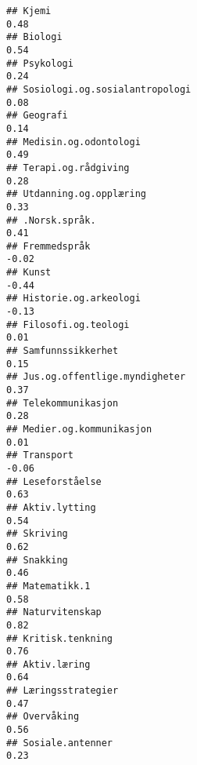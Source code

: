 \documentclass[
]{article}
\begin{document}
\begin{verbatim}
## Kjemi                                                                             0.48
## Biologi                                                                           0.54
## Psykologi                                                                         0.24
## Sosiologi.og.sosialantropologi                                                    0.08
## Geografi                                                                          0.14
## Medisin.og.odontologi                                                             0.49
## Terapi.og.rådgiving                                                               0.28
## Utdanning.og.opplæring                                                            0.33
## .Norsk.språk.                                                                     0.41
## Fremmedspråk                                                                     -0.02
## Kunst                                                                            -0.44
## Historie.og.arkeologi                                                            -0.13
## Filosofi.og.teologi                                                               0.01
## Samfunnssikkerhet                                                                 0.15
## Jus.og.offentlige.myndigheter                                                     0.37
## Telekommunikasjon                                                                 0.28
## Medier.og.kommunikasjon                                                           0.01
## Transport                                                                        -0.06
## Leseforståelse                                                                    0.63
## Aktiv.lytting                                                                     0.54
## Skriving                                                                          0.62
## Snakking                                                                          0.46
## Matematikk.1                                                                      0.58
## Naturvitenskap                                                                    0.82
## Kritisk.tenkning                                                                  0.76
## Aktiv.læring                                                                      0.64
## Læringsstrategier                                                                 0.47
## Overvåking                                                                        0.56
## Sosiale.antenner                                                                  0.23

\end{verbatim}
\end{document}
